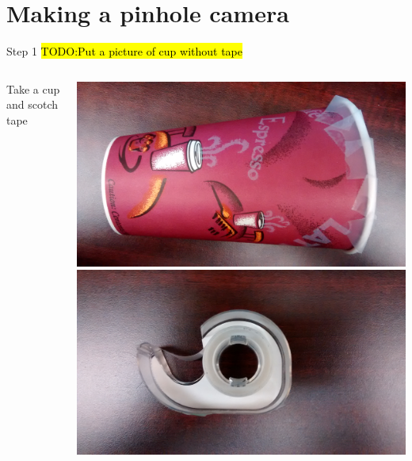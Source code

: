 \section{Making a pinhole camera}
\begin{frame}{Step 1}
  \hl{TODO:Put a picture of cup without tape}
  \begin{columns}
    \begin{column}{0.4\textwidth}
      Take a cup and scotch tape
    \end{column}
    \begin{column}{0.6\textwidth}
      \includegraphics[width=\textwidth]{media/cup.jpg}\\
      \includegraphics[width=\textwidth]{media/tape.jpg}
    \end{column}
  \end{columns}
\end{frame}

